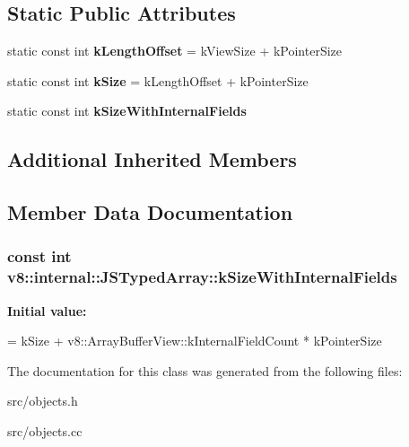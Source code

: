 \subsection*{Static Public Attributes}
\begin{DoxyCompactItemize}
\item 
\hypertarget{classv8_1_1internal_1_1_j_s_typed_array_afa057f06964f45e0c4f8608cff1ce29d}{}static const int {\bfseries k\+Length\+Offset} = k\+View\+Size + k\+Pointer\+Size\label{classv8_1_1internal_1_1_j_s_typed_array_afa057f06964f45e0c4f8608cff1ce29d}

\item 
\hypertarget{classv8_1_1internal_1_1_j_s_typed_array_a006a87f75ba3983cea6af3324d258eff}{}static const int {\bfseries k\+Size} = k\+Length\+Offset + k\+Pointer\+Size\label{classv8_1_1internal_1_1_j_s_typed_array_a006a87f75ba3983cea6af3324d258eff}

\item 
static const int {\bfseries k\+Size\+With\+Internal\+Fields}
\end{DoxyCompactItemize}
\subsection*{Additional Inherited Members}


\subsection{Member Data Documentation}
\hypertarget{classv8_1_1internal_1_1_j_s_typed_array_ab63cf4f45ce0038f5c65de5661778b40}{}
\subsubsection[{k\+Size\+With\+Internal\+Fields}]{\setlength{\rightskip}{0pt plus 5cm}const int v8\+::internal\+::\+J\+S\+Typed\+Array\+::k\+Size\+With\+Internal\+Fields\hspace{0.3cm}{\ttfamily [static]}}\label{classv8_1_1internal_1_1_j_s_typed_array_ab63cf4f45ce0038f5c65de5661778b40}
{\bfseries Initial value\+:}
\begin{DoxyCode}
=
      kSize + v8::ArrayBufferView::kInternalFieldCount * kPointerSize
\end{DoxyCode}


The documentation for this class was generated from the following files\+:\begin{DoxyCompactItemize}
\item 
src/objects.\+h\item 
src/objects.\+cc\end{DoxyCompactItemize}
